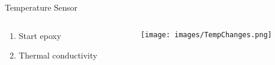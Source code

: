 


\begin{frame}{Temperature Sensor}
    \begin{columns}
        \begin{column}{0.5\textwidth}
            \begin{enumerate}
                \item Start epoxy
                \item Thermal conductivity
            \end{enumerate}
        \end{column}
        \begin{column}{0.5\textwidth}
            \texttt{[image: images/TempChanges.png]}
        \end{column}
    \end{columns}
\end{frame}

